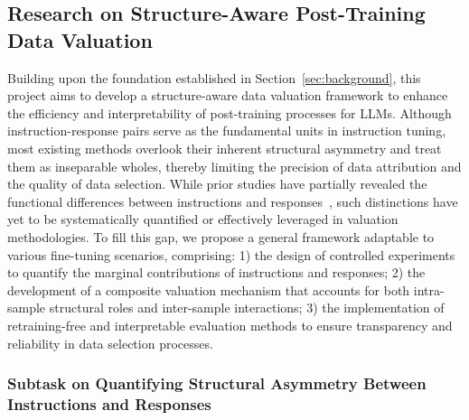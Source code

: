 \documentclass[12pt,a4paper]{article}
\begin{document}
\subsection{Research on Structure-Aware Post-Training Data Valuation}
\label{sec:structure-aware-valuation}
Building upon the foundation established in Section~\ref{sec:background}, this project aims to develop a structure-aware data valuation framework to enhance the efficiency and interpretability of post-training processes for LLMs. Although instruction-response pairs serve as the fundamental units in instruction tuning, most existing methods overlook their inherent structural asymmetry and treat them as inseparable wholes, thereby limiting the precision of data attribution and the quality of data selection. While prior studies have partially revealed the functional differences between instructions and responses~\cite{DBLP:conf/naacl/WuYCPWLY24}, such distinctions have yet to be systematically quantified or effectively leveraged in valuation methodologies. To fill this gap, we propose a general framework adaptable to various fine-tuning scenarios, comprising: 1) the design of controlled experiments to quantify the marginal contributions of instructions and responses; 2) the development of a composite valuation mechanism that accounts for both intra-sample structural roles and inter-sample interactions; 3) the implementation of retraining-free and interpretable evaluation methods to ensure transparency and reliability in data selection processes.


\vspace{-10pt}
\subsubsection{Subtask on Quantifying Structural Asymmetry Between Instructions and Responses}
\label{subsubsec:instr_resp_asymmetry}
\vspace{-5pt}
\end{document}
